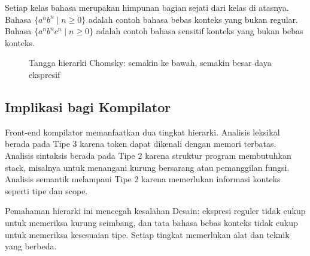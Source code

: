Setiap kelas bahasa merupakan himpunan bagian sejati dari kelas di
atasnya. Bahasa \(\{a^n b^n \mid n \ge 0\}\) adalah contoh bahasa
bebas konteks yang bukan regular. Bahasa
\(\{a^n b^n c^n \mid n \ge 0\}\) adalah contoh bahasa sensitif konteks
yang bukan bebas konteks.

\begin{figure}[H]
\centering
{}
\caption{Tangga hierarki Chomsky: semakin ke bawah, semakin besar daya ekspresif}
\label{fig:ch02-chomsky}
\end{figure}

\subsection{Implikasi bagi Kompilator}

Front-end kompilator memanfaatkan dua tingkat hierarki. Analisis
leksikal berada pada Tipe 3 karena token dapat dikenali dengan memori
terbatas. Analisis sintaksis berada pada Tipe 2 karena struktur
program membutuhkan stack, misalnya untuk menangani kurung bersarang
atau pemanggilan fungsi. Analisis semantik melampaui Tipe 2 karena
memerlukan informasi konteks seperti tipe dan scope.

Pemahaman hierarki ini mencegah kesalahan Desain: ekspresi reguler
tidak cukup untuk memeriksa kurung seimbang, dan tata bahasa bebas
konteks tidak cukup untuk memeriksa kesesuaian tipe. Setiap tingkat
memerlukan alat dan teknik yang berbeda.
